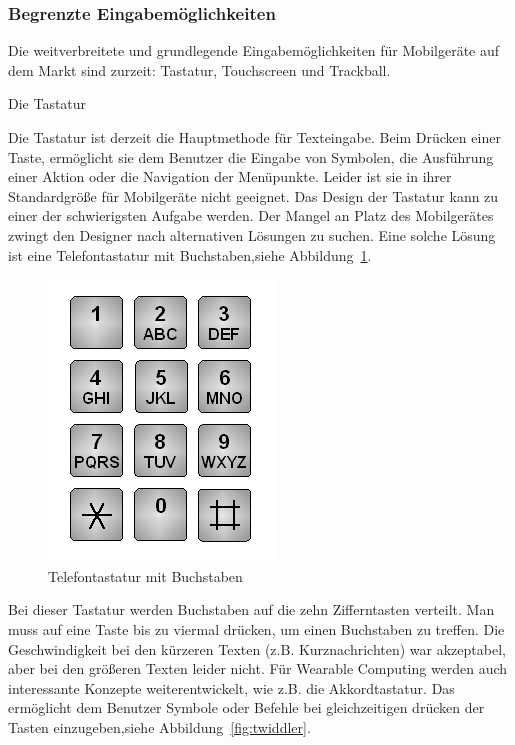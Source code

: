 
\subsubsection{Begrenzte Eingabemöglichkeiten} %
\label{ssub:einschr_nkungen_in_mentalen_bereich}
Die weitverbreitete und grundlegende Eingabemöglichkeiten für Mobilgeräte auf dem Markt sind zurzeit: Tastatur, Touchscreen und Trackball.

Die Tastatur

Die Tastatur ist derzeit die Hauptmethode für Texteingabe.  Beim Drücken einer Taste, ermöglicht sie dem Benutzer die Eingabe von Symbolen, die Ausführung einer Aktion oder die Navigation der Menüpunkte. Leider ist sie in ihrer Standardgröße für Mobilgeräte nicht geeignet. Das Design der Tastatur kann zu einer der schwierigsten Aufgabe werden. Der Mangel an Platz des Mobilgerätes zwingt den Designer nach alternativen Lösungen zu suchen. Eine solche Lösung ist eine Telefontastatur mit Buchstaben,siehe Abbildung~\ref{fig:tastatur}. 

 \begin{figure}[h]
 \centering
 \includegraphics[height=0.25\textheight]{img/Tastatur_ITU-T-E161_4x3.png}
 \caption{Telefontastatur mit Buchstaben}\label{fig:tastatur}
\end{figure}

Bei dieser Tastatur werden Buchstaben auf die zehn Zifferntasten verteilt. Man muss auf eine Taste bis zu viermal drücken, um einen Buchstaben zu treffen. Die Geschwindigkeit bei den kürzeren Texten (z.B. Kurznachrichten) war akzeptabel, aber bei den größeren Texten leider nicht.  Für Wearable Computing werden auch interessante Konzepte weiterentwickelt, wie z.B. die Akkordtastatur. Das ermöglicht dem Benutzer Symbole oder Befehle bei gleichzeitigen drücken der Tasten einzugeben,siehe Abbildung~\ref{fig:twiddler}. 

